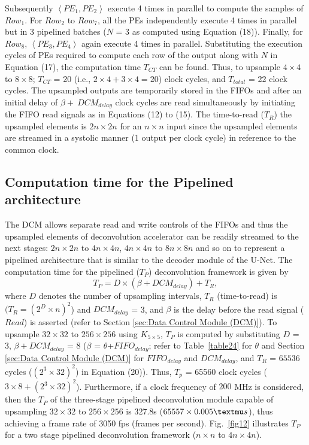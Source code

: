 \documentclass[journal]{IEEEtran}
\begin{document}
Subsequently $\left \langle PE_1, PE_2  \right \rangle$ execute 4 times in parallel to compute the samples of $Row_1$. For $Row_2$ to $Row_7$, all the PEs independently execute 4 times in parallel but in 3 pipelined batches ($N$ = 3 as computed using Equation (18)). Finally, for $Row_8$,  $\left \langle PE_3,  PE_4 \right \rangle$ again execute 4 times in parallel. Substituting the execution cycles of PEs required to compute each row of the output along with $N$ in Equation (17), the computation time $T_{CT}$ can be found. Thus, to upsample $4 \times 4$ to $8 \times 8$; $T_{CT}$ = 20 (i.e., $2\times 4 + 3\times 4 = 20$) clock cycles, and $T_{total}$ = 22 clock cycles.  The upsampled outputs are temporarily stored in the FIFOs and after an initial delay of $\beta +\ DCM_{delay}$ clock cycles are read simultaneously by initiating the FIFO read signals as in Equations (12) to (15). The time-to-read ($T_R$) the upsampled elements is $2n\times2n$ for an $n\times n$ input since the upsampled elements are streamed in a systolic manner (1 output per clock cycle) in reference to the common clock.  

 


\subsection{Computation time for the Pipelined architecture}\label{sec:About architecture time taken}
The DCM allows separate read and write controls of the FIFOs and thus the upsampled elements of  deconvolution accelerator can be readily streamed to the next stages: $2n\times 2n$ to $4n\times 4n$, $4n\times 4n$ to $8n\times 8n$ and so on to represent a pipelined architecture that is similar to  the decoder module of the U-Net. The computation time for the pipelined ($T_P$) deconvolution framework is given by
\begin{equation}
    T_P = D \times (\beta + DCM_{delay}) + T_R,
\end{equation}
where $D$ denotes the number of upsampling intervals, $T_{R}$ (time-to-read) is $ (T_{R}=(2^D \times n)^2$) and  $DCM_{delay}$ = 3, and $\beta$ is the delay before the read signal ($Read$) is asserted (refer to Section \ref{sec:Data Control Module (DCM)}). To upsample  $32 \times 32$ to $256 \times 256$ using  $K_{5\times5}$, $T_{P}$ is computed by substituting $D$ = 3, $\beta + DCM_{delay}$ = 8 ($\beta$ = $\theta$+$FIFO_{delay}$; refer  to Table~\ref{table24} for $\theta$ and Section \ref{sec:Data Control Module (DCM)} for $FIFO_{delay}$ and $DCM_{delay}$, and $T_R$ = $65536$ cycles ($(2^3 \times 32)^2$) in Equation (20)). Thus, $T_p$ = 65560 clock cycles ($3 \times 8 + (2^3\times32)^2$). Furthermore, if a clock frequency of $200$ MHz is considered, then the $T_P$ of the three-stage pipelined deconvolution module capable of  upsampling $32\times32$ to $256\times256$ is 327.8\textmu s ($65557 \times 0.005\textmu s$), thus achieving a frame rate of 3050 fps (frames per second). Fig.~\ref{fig12} illustrates $T_P$  for a two stage pipelined deconvolution framework ($n\times n$ to $4n\times4n$).
\end{document}
